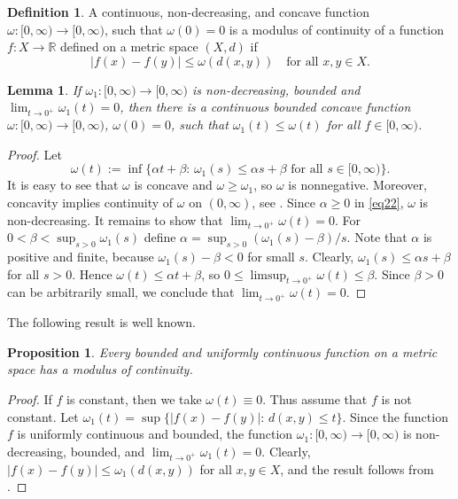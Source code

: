 \documentclass[intlimits,12pt,reqno]{amsart}
\newcommand{\bbbr}{\mathbb R}
\numberwithin{equation}{section}
\newtheorem{lemma}[theorem]{Lemma}
\newtheorem{proposition}[theorem]{Proposition}
\theoremstyle{definition}
\newtheorem{definition}[theorem]{Definition}
\begin{document}
\begin{definition}
\label{d3}
A continuous, non-decreasing, and concave function $\omega:[0,\infty)\to [0,\infty)$, such that $\omega(0)=0$ is a modulus
of continuity of a function $f:X\to\bbbr$ defined on a metric space $(X,d)$ if
\begin{equation}
\label{eq21}
|f(x)-f(y)|\leq\omega(d(x,y))
\quad
\text{for all $x,y\in X$.}
\end{equation}
\end{definition}
\begin{lemma}
\label{T98}
If $\omega_1:[0,\infty)\to [0,\infty)$ is non-decreasing, bounded and $\lim_{t\to 0^+}\omega_1(t)=0$, then there is a continuous bounded concave function $\omega:[0,\infty)\to [0,\infty)$, $\omega(0)=0$, such that $\omega_1(t)\leq \omega(t)$ for all $f\in [0,\infty)$.
\end{lemma}
\begin{proof}
Let
\begin{equation}
\label{eq22}
\omega(t):=\inf\{\alpha t+\beta:\, \text{$\omega_1(s)\leq\alpha s+\beta$ for all $s\in [0,\infty)$}\}.
\end{equation}
It is easy to see that $\omega$ is concave and $\omega\geq\omega_1$, so $\omega$ is nonnegative.
Moreover, concavity implies continuity of $\omega$ on $(0,\infty)$, see
\cite[Theorem~A,~p.4]{RV}.
Since $\alpha\geq 0$ in \eqref{eq22}, $\omega$ is non-decreasing. It remains to show that $\lim_{t\to 0^+}\omega(t)=0$.
For $0<\beta<\sup_{s>0}\omega_1(s)$ define $\alpha=\sup_{s>0}(\omega_1(s)-\beta)/s$. Note that $\alpha$ is positive and finite, because $\omega_1(s)-\beta<0$ for small $s$.
Clearly, $\omega_1(s)\leq\alpha s+\beta$ for all $s>0$.
Hence $\omega(t)\leq\alpha t+\beta$, so $0\leq\limsup_{t\to 0^+}\omega(t)\leq \beta$. Since $\beta>0$ can be arbitrarily small, we conclude that $\lim_{t\to 0^+}\omega(t)=0$.
\end{proof}
The following result is well known.
\begin{proposition}
\label{T29}
Every bounded and uniformly continuous function on a metric space has a modulus of continuity.
\end{proposition}
\begin{proof}
If $f$ is constant, then we take $\omega(t)\equiv 0$. Thus assume that $f$ is not constant.
Let
$\omega_1(t)=\sup\{|f(x)-f(y)|:\, d(x,y)\leq t\}$. Since the function $f$ is uniformly continuous and bounded,
the function $\omega_1:[0,\infty)\to [0,\infty)$ is non-decreasing, bounded, and $\lim_{t\to 0^+}\omega_1(t)=0$.
Clearly, $|f(x)-f(y)|\leq \omega_1(d(x,y))$ for all $x,y\in X$, and
the result follows from .
\end{proof}
\end{document}
